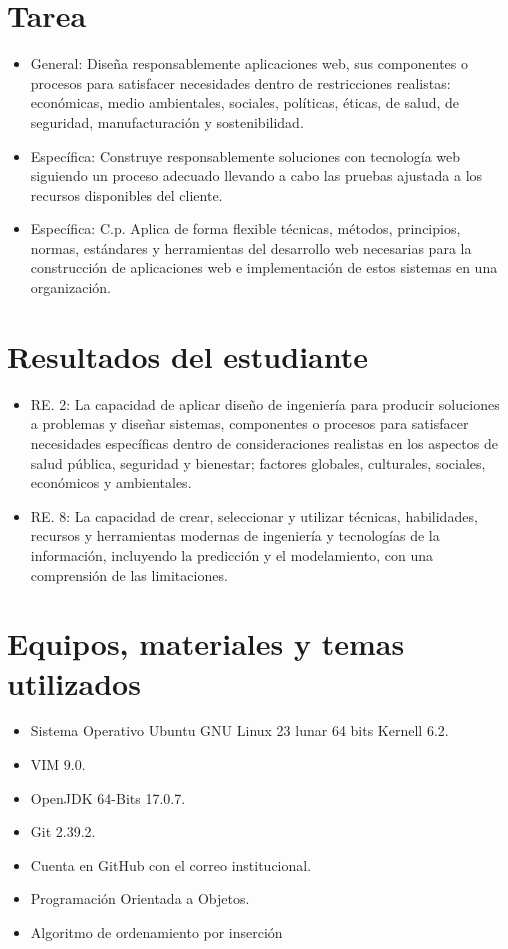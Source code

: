 \documentclass{article}
\begin{document}
	\section{Tarea}
	\begin{itemize}		
		\item General: Diseña responsablemente aplicaciones web, sus componentes o procesos para satisfacer necesidades dentro de restricciones realistas: económicas, medio ambientales, sociales,
políticas, éticas, de salud, de seguridad, manufacturación y sostenibilidad.
		\item Específica: Construye responsablemente soluciones con tecnología web siguiendo un proceso adecuado llevando a cabo las pruebas ajustada a los recursos disponibles del cliente.
		\item Específica: C.p. Aplica de forma flexible técnicas, métodos, principios, normas, estándares y herramientas del desarrollo web necesarias para la construcción de aplicaciones web e implementación de estos sistemas en una organización.
	\end{itemize}
	
	\section{Resultados del estudiante}
	\begin{itemize}
		\item RE. 2: La capacidad de aplicar diseño de ingeniería para producir soluciones a problemas y diseñar sistemas, componentes o procesos para satisfacer necesidades específicas dentro de consideraciones realistas en los aspectos de salud pública, seguridad y bienestar; factores globales, culturales, sociales, económicos y ambientales.
		\item RE. 8: La capacidad de crear, seleccionar y utilizar técnicas, habilidades, recursos y herramientas modernas de ingeniería y tecnologías de la información, incluyendo la predicción y el modelamiento, con una comprensión de las limitaciones.
	\end{itemize}
		
	\section{Equipos, materiales y temas utilizados}
	\begin{itemize}
		\item Sistema Operativo Ubuntu GNU Linux 23 lunar 64 bits Kernell 6.2.
		\item VIM 9.0.
		\item OpenJDK 64-Bits 17.0.7.
		\item Git 2.39.2.
		\item Cuenta en GitHub con el correo institucional.
		\item Programación Orientada a Objetos.
		\item Algoritmo de ordenamiento por inserción	
	\end{itemize}
	
\end{document}
